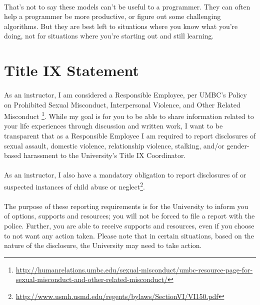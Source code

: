 \documentclass[letter,11pt]{article}
\begin{document}
\paragraph{}That's not to say these models can't be useful to a programmer. They can often help a programmer be more productive, or figure out some challenging algorithms. But they are best left to situations where you know what you're doing, not for situations where you're starting out and still learning.

\section*{Title IX Statement}
\paragraph{}As an instructor, I am considered a Responsible Employee, per UMBC’s Policy on Prohibited Sexual Misconduct, Interpersonal Violence, and Other Related Misconduct \footnote{\url{http://humanrelations.umbc.edu/sexual-misconduct/umbc-resource-page-for-sexual-misconduct-and-other-related-misconduct/}}. While my goal is for you to be able to share information related to your life experiences through discussion and written work, I want to be transparent that as a Responsible Employee I am required to report disclosures of sexual assault, domestic violence, relationship violence, stalking, and/or gender-based harassment to the University’s Title IX Coordinator.

\paragraph{}As an instructor, I also have a mandatory obligation to report disclosures of or suspected instances of child abuse or neglect\footnote{\url{http://www.usmh.usmd.edu/regents/bylaws/SectionVI/VI150.pdf}}.

\paragraph{}The purpose of these reporting requirements is for the University to inform you of options, supports and resources; you will not be forced to file a report with the police. Further, you are able to receive supports and resources, even if you choose to not want any action taken. Please note that in certain situations, based on the nature of the disclosure, the University may need to take action.
\end{document}
